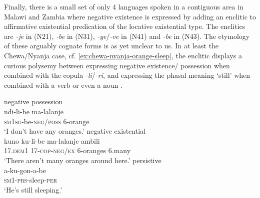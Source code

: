 \documentclass[output=paper,draft,draftmode,colorlinks,citecolor=brown]{langscibook}
\begin{document}
Finally, there is a small set of only 4 languages spoken in a contiguous
area in Malawi and Zambia where negative existence is expressed by adding
an enclitic to affirmative existential predication of the locative
existential type. The enclitics are \textit{-je} in  (N21),
\textit{-be} in  (N31),
\textit{-ye}/\textit{-ve} in  (N41) and \textit{-be} in
 (N43). The etymology of these arguably cognate forms is as
yet unclear to us. In at least the Chewa\slash Nyanja case, cf. \ref{ex:chewa-nyanja-orange-sleep}, the enclitic
displays a curious polysemy between expressing negative existence\slash
possession when combined with the copula \textit{-li}/\textit{-ri}, and expressing the
phasal meaning `still' when combined with a verb or even a noun 
%
\parencites[116]{Hetherwick1916}[97, 99]{Watkins1937}[209]{Price1953}
[116, 205, 279]{StevickHollander1965}[20--21]{Paas2004}
[60, 68]{Mchombo2004}[150, 153, 161]{Kiso2012}.  
%

\ea\label{ex:chewa-nyanja-orange-sleep}  \ea negative possession\\
\gll ndi-li-be ma-lalanje\\ \textsc{sm1sg}-be-\textsc{neg/poss} 6-orange\\
\glt 	`I don't have any oranges.'
\ex negative existential\\
\gll kuno
ku-li-be ma-lalanje ambili\\ 17.\textsc{dem1} 17-\textsc{cop-neg/ex}
6-oranges 6.many\\
\glt `There aren't many oranges around here.'
\ex
persistive\\
\gll a-ku-gon-a-be\\ \textsc{sm1-prs}-sleep-\textsc{per}\\
\glt `He's still sleeping.'
\z
\z
\end{document}
